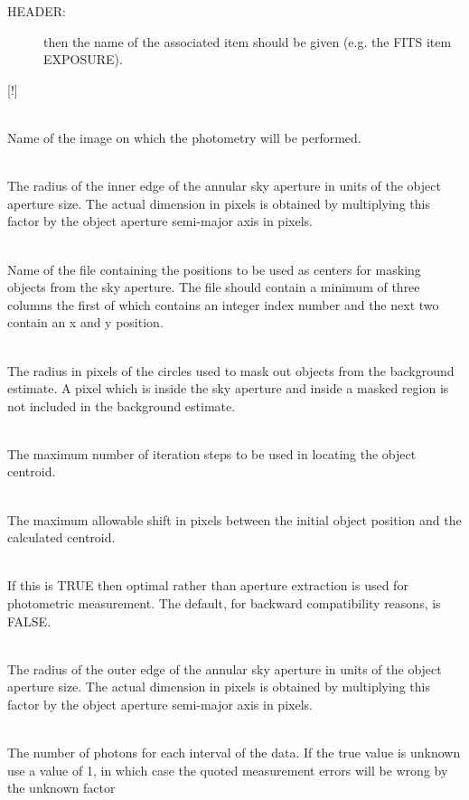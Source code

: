 \documentclass[twoside,11pt]{article}
\renewcommand{\_}{\texttt{\symbol{95}}}
\newcommand{\sstsubsection}[1]{ \item[{#1}] \mbox{} \\}
\newcommand{\sstsubsection}[1]{\item[{#1}]}
\begin{document}
{{{\begin{description}
        \item[HEADER:] then the name of the associated item should be given
          (e.g. the FITS item EXPOSURE).
        \end{description}
        [!]
      }
      \sstsubsection{
         IN = IMAGE (Read)
      }{
         Name of the image on which the photometry will be performed.
      }
      \sstsubsection{
         INNER = \_REAL (Read)
      }{
         The radius of the inner edge of the annular sky aperture in
         units of the object aperture size. The actual dimension in
         pixels is obtained by multiplying this factor by the object
         aperture semi-major axis in pixels.
      }
      \sstsubsection{
         MASKFILE = FILENAME (Read)
      }{
         Name of the file containing the positions to be used as
         centers for masking objects from the sky aperture. The file
         should contain a minimum of three columns the first of which
         contains an integer index number and the next two contain an
         x and y position.
      }
      \sstsubsection{
         MASKRAD = \_REAL (Read)
      }{
         The radius in pixels of the circles used to mask out objects
         from the background estimate. A pixel which is inside the sky
         aperture and inside a masked region is not included in the
         background estimate.
      }
      \sstsubsection{
         MAXITER = \_INTEGER (Read)
      }{
         The maximum number of iteration steps to be used in locating
         the object centroid.
      }
      \sstsubsection{
         MAXSHIFT = \_REAL (Read)
      }{
         The maximum allowable shift in pixels between the initial
         object position and the calculated centroid.
      }
      \sstsubsection{
         OPTIMA = \_LOGICAL (Read)
      }{
         If this is TRUE then optimal rather than aperture extraction
         is used for photometric measurement. The default, for backward
         compatibility reasons, is FALSE.
      }      
      \sstsubsection{
         OUTER = \_REAL (Read)
      }{
         The radius of the outer edge of the annular sky aperture in
         units of the object aperture size. The actual dimension in
         pixels is obtained by multiplying this factor by the object
         aperture semi-major axis in pixels.
      }
      \sstsubsection{
         PADU = \_REAL (Read)
      }{
         The number of photons for each interval of the data. If the
         true value is unknown use a value of 1, in which case the
         quoted measurement errors will be wrong by the unknown factor
}}}
\end{document}

